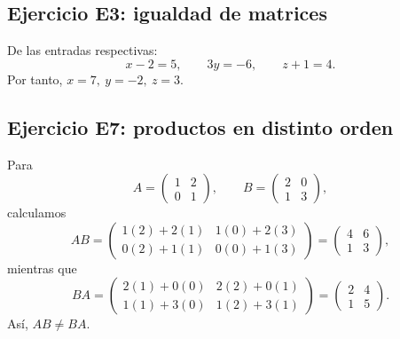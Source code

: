 \documentclass[12pt]{article}
\theoremstyle{remark}
\begin{document}
\subsection*{Ejercicio E3: igualdad de matrices}
De las entradas respectivas:
\[
x-2=5,\qquad 3y=-6,\qquad z+1=4.
\]
Por tanto, $\boxed{x=7,\ y=-2,\ z=3}$.

\subsection*{Ejercicio E7: productos en distinto orden}
Para
\[
A=\begin{pmatrix}1&2\\0&1\end{pmatrix},\qquad
B=\begin{pmatrix}2&0\\1&3\end{pmatrix},
\]
calculamos
\[
AB=\begin{pmatrix}1(2)+2(1)&1(0)+2(3)\\0(2)+1(1)&0(0)+1(3)\end{pmatrix}
=\boxed{\begin{pmatrix}4&6\\1&3\end{pmatrix}},
\]
mientras que
\[
BA=\begin{pmatrix}2(1)+0(0)&2(2)+0(1)\\1(1)+3(0)&1(2)+3(1)\end{pmatrix}
=\boxed{\begin{pmatrix}2&4\\1&5\end{pmatrix}}.
\]
Así, $AB\ne BA$.
\end{document}
